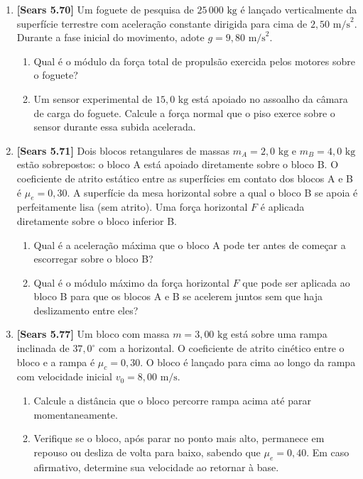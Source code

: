 \documentclass[11pt,a4paper]{article}
\begin{document}
\begin{enumerate}[label=\textbf{\arabic*.}, leftmargin=*, itemsep=0.45cm, resume]
\item \textbf{[Sears 5.70]} Um foguete de pesquisa de $25\,000\text{ kg}$ é lançado verticalmente da superfície terrestre com aceleração constante dirigida para cima de $2,50\text{ m/s}^2$. Durante a fase inicial do movimento, adote $g = 9,80\text{ m/s}^2$.
\begin{enumerate}[label=\alph*)]
    \item Qual é o módulo da força total de propulsão exercida pelos motores sobre o foguete?
    \item Um sensor experimental de $15,0\text{ kg}$ está apoiado no assoalho da câmara de carga do foguete. Calcule a força normal que o piso exerce sobre o sensor durante essa subida acelerada.
\end{enumerate}

\item \textbf{[Sears 5.71]} Dois blocos retangulares de massas $m_A = 2,0\text{ kg}$ e $m_B = 4,0\text{ kg}$ estão sobrepostos: o bloco A está apoiado diretamente sobre o bloco B. O coeficiente de atrito estático entre as superfícies em contato dos blocos A e B é $\mu_e = 0,30$. A superfície da mesa horizontal sobre a qual o bloco B se apoia é perfeitamente lisa (sem atrito). Uma força horizontal $F$ é aplicada diretamente sobre o bloco inferior B.
\begin{enumerate}[label=\alph*)]
    \item Qual é a aceleração máxima que o bloco A pode ter antes de começar a escorregar sobre o bloco B?
    \item Qual é o módulo máximo da força horizontal $F$ que pode ser aplicada ao bloco B para que os blocos A e B se acelerem juntos sem que haja deslizamento entre eles?
\end{enumerate}

\item \textbf{[Sears 5.77]} Um bloco com massa $m = 3,00\text{ kg}$ está sobre uma rampa inclinada de $37,0^\circ$ com a horizontal. O coeficiente de atrito cinético entre o bloco e a rampa é $\mu_c = 0,30$. O bloco é lançado para cima ao longo da rampa com velocidade inicial $v_0 = 8,00\text{ m/s}$.
\begin{enumerate}[label=\alph*)]
    \item Calcule a distância que o bloco percorre rampa acima até parar momentaneamente.
    \item Verifique se o bloco, após parar no ponto mais alto, permanece em repouso ou desliza de volta para baixo, sabendo que $\mu_e = 0,40$. Em caso afirmativo, determine sua velocidade ao retornar à base.
\end{enumerate}


\end{enumerate}
\end{document}
